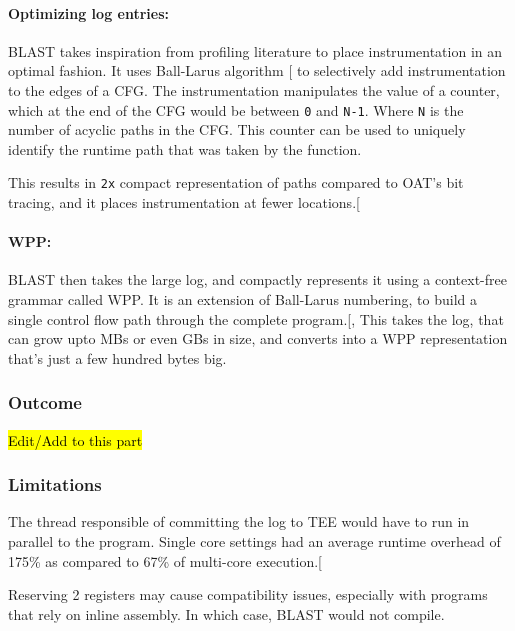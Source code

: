 \documentclass[a4paper, nobind]{templates/ociamthesis}
\begin{document}
\paragraph{Optimizing log entries:}\label{optimizing-log-entries}

BLAST takes inspiration from profiling literature to place instrumentation in
an optimal fashion. It uses Ball-Larus algorithm {[}\citeproc{ref-balllarus}{11}{]} to selectively
add instrumentation to the edges of a CFG. The instrumentation manipulates the value of a counter,
which at the end of the CFG would be between \texttt{0} and \texttt{N-1}. Where \texttt{N} is the number
of acyclic paths in the CFG. This counter can be used to uniquely identify the
runtime path that was taken by the function.

This results in \texttt{2x} compact representation of paths compared to OAT's bit tracing,
and it places instrumentation at fewer locations.{[}\citeproc{ref-blast}{25}{]}

\paragraph{WPP:}\label{wpp}

BLAST then takes the large log, and compactly represents it using a context-free
grammar called WPP. It is an extension of Ball-Larus numbering, to build a single
control flow path through the complete program.{[}, \citeproc{ref-blast}{25}{]}
This takes the log, that can grow upto MBs or even GBs in size, and converts into
a WPP representation that's just a few hundred bytes big.

\subsubsection{Outcome}\label{outcome}

\hl{Edit/Add to this part}

\subsubsection{Limitations}\label{limitations}

The thread responsible of committing the log to TEE would have to run in parallel
to the program. Single core settings had an average runtime overhead of 175\%
as compared to 67\% of multi-core execution.{[}\citeproc{ref-blast}{25}{]}

Reserving 2 registers may cause compatibility issues, especially with programs
that rely on inline assembly. In which case, BLAST would not compile.
\end{document}
